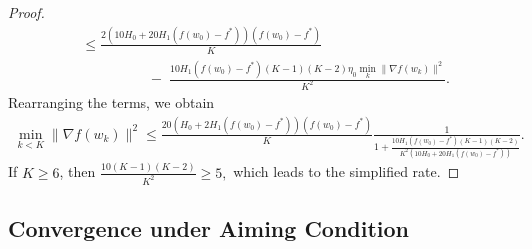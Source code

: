 \documentclass[a4paper,11pt]{article}
\newcommand{\1}{\mathbbm{1}}
\theoremstyle{plain}
\begin{document}
\begin{proof}
\begin{align*}
        &\le \frac{2(10H_0 + 20H_1(f(w_0)-f^*))(f(w_0)-f^*)}{K}\\
        &\hspace{2cm} -\; \frac{10H_1(f(w_0)-f^*)(K-1)(K-2)\eta_0\min_k\|\nabla f(w_k)\|^2}{K^2}.
    \end{align*}
    Rearranging the terms, we obtain
    \begin{align*}
         \min_{k<K}\|\nabla f(w_k)\|^2 \le \frac{20(H_0+2H_1(f(w_0)-f^*))(f(w_0)-f^*)}{K}\frac{1}{1+\frac{10H_1(f(w_0)-f^*)(K-1)(K-2)}{K^2(10H_0+20H_1(f(w_0)-f^*))}}. 
    \end{align*}
    If $K\ge 6$, then $\frac{10(K-1)(K-2)}{K^2}\ge 5,$ which leads to the simplified rate.
\end{proof}


\subsection{Convergence under Aiming Condition}
\end{document}
